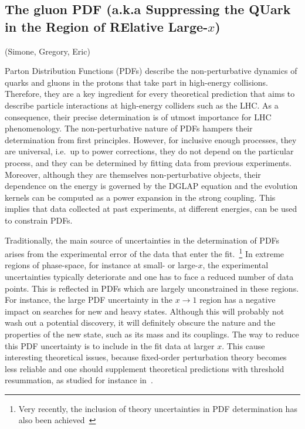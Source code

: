 \subsection{The gluon PDF (a.k.a Suppressing the QUark in the Region of RElative Large-$x$)}
(Simone, Gregory, Eric)

Parton Distribution Functions (PDFs) describe the non-perturbative dynamics of quarks and gluons in the protons that take part in high-energy collisions. Therefore, they are a key ingredient for every theoretical prediction that aims to describe particle interactions at high-energy colliders such as the LHC. As a consequence, their precise determination is of utmost importance for LHC phenomenology. 
%
The non-perturbative nature of PDFs hampers their determination from first principles.
%
However, for inclusive enough processes, they are universal, i.e.\, up to power corrections, they do not depend on the particular process, and they can be determined by fitting data from previous experiments. Moreover, although they are themselves non-perturbative objects, their dependence on the energy is governed by the DGLAP equation and the evolution kernels can be computed as a power expansion in the strong coupling. This implies that data collected at past experiments, at different energies, can be used to constrain PDFs. 

Traditionally, the main source of uncertainties in the determination of PDFs arises from the experimental error of the data that enter the fit.~\footnote{Very recently, the inclusion of theory uncertainties in PDF determination has also been achieved~\cite{Harland-Lang:2018bxd,AbdulKhalek:2019ihb,AbdulKhalek:2019bux}} In extreme regions of phase-space, for instance at small- or large-$x$, the experimental uncertainties typically deteriorate and one has to face a reduced number of data points. This is reflected in PDFs which are largely unconstrained in these regions. 
%
For instance, the large PDF uncertainty in the $x\to 1$ region has a negative impact on searches for new and heavy states.
%
 Although this will probably not wash out a potential discovery, it will definitely obscure the nature and the properties of the new state, such as its mass and its couplings. 
%
The way to reduce this PDF uncertainty is to include in the fit data at larger $x$. This cause interesting theoretical issues, because fixed-order perturbation theory becomes less reliable and one should supplement theoretical predictions with threshold resummation, as studied for instance in~\cite{Corcella:2005us,Sato:2013wea,Westmark:2013vea,Bonvini:2015ira,Accardi:2014qda}.


